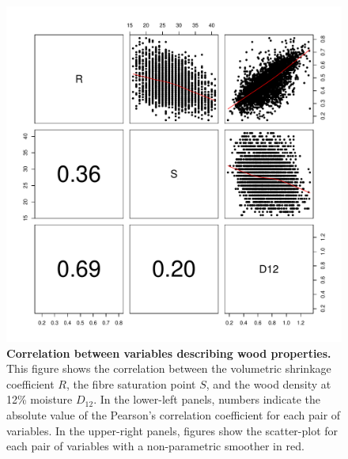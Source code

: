 \documentclass[a4paper, 12pt, leqno, dvipsnames]{article}\usepackage[]{graphicx}\usepackage[]{color}
\begin{document}
\begin{figure}[!ht] 
    \begin{center} 

      \includegraphics[width=12cm]{figs/Correlation.pdf}

      \caption{\textbf{Correlation between variables describing wood properties.} This figure shows the correlation between the volumetric shrinkage coefficient $R$, the fibre saturation point $S$, and the wood density at 12\% moisture $D_{12}$. In the lower-left panels, numbers indicate the absolute value of the Pearson's correlation coefficient for each pair of variables. In the upper-right panels, figures show the scatter-plot for each pair of variables with a non-parametric smoother in red.}

      \label{fig:Correlations}
    \end{center}
\end{figure}

\newpage
\end{document}
